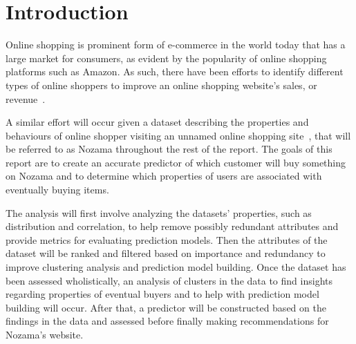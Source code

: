 \documentclass[../cmpe-251-project-report.tex]{subfiles}
\begin{document}
  \chapter{Introduction}
  Online shopping is prominent form of e-commerce in the world today that has a large market for consumers, as evident by the popularity of online shopping platforms such as Amazon. As such, there have been efforts to identify different types of online shoppers to improve an online shopping website's sales, or revenue~\cite{rohm_typology_2004}.

  A similar effort will occur given a dataset describing the properties and behaviours of online shopper visiting an unnamed online shopping site~\cite{sakar_real-time_2019}, that will be referred to as Nozama throughout the rest of the report. The goals of this report are to create an accurate predictor of which customer will buy something on Nozama and to determine which properties of users are associated with eventually buying items.

  The analysis will first involve analyzing the datasets' properties, such as distribution and correlation, to help remove possibly redundant attributes and provide metrics for evaluating prediction models. Then the attributes of the dataset will be ranked and filtered based on importance and redundancy to improve clustering analysis and prediction model building. Once the dataset has been assessed wholistically, an analysis of clusters in the data to find insights regarding properties of eventual buyers and to help with prediction model building will occur. After that, a predictor will be constructed based on the findings in the data and assessed before finally making recommendations for Nozama's website.
\end{document}
